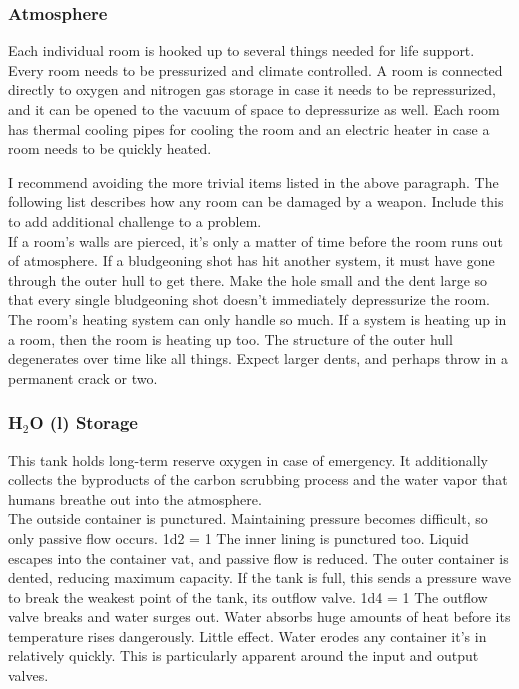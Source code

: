 \documentclass[a4paper]{article}
\begin{document}
\vspace{-0.5cm} \hspace{-18pt} \subsubsection{Atmosphere} \label{life_atmosphere} \vspace{-0.2cm}
Each individual room is hooked up to several things needed for life support. Every room needs to be pressurized and climate controlled. A room is connected directly to oxygen and nitrogen gas storage in case it needs to be repressurized, and it can be opened to the vacuum of space to depressurize as well. Each room has thermal cooling pipes for cooling the room and an electric heater in case a room needs to be quickly heated.

I recommend avoiding the more trivial items listed in the above paragraph. The following list describes how any room can be damaged by a weapon. Include this to add additional challenge to a problem. 
\\ \pbhw
{If a room's walls are pierced, it's only a matter of time before the room runs out of atmosphere.}
{If a bludgeoning shot has hit another system, it must have gone through the outer hull to get there. Make the hole small and the dent large so that every single bludgeoning shot doesn't immediately depressurize the room.}
{The room's heating system can only handle so much. If a system is heating up in a room, then the room is heating up too.}
{The structure of the outer hull degenerates over time like all things. Expect larger dents, and perhaps throw in a permanent crack or two. }


\vspace{-0.5cm} \hspace{-18pt} \subsubsection{H$_2$O (l) Storage} \label{life_h2o_storage} \vspace{-0.2cm}
This tank holds long-term reserve oxygen in case of emergency. It additionally collects the byproducts of the carbon scrubbing process and the water vapor that humans breathe out into the atmosphere.
\\ \pbhw
{The outside container is punctured. Maintaining pressure becomes difficult, so only passive flow occurs. \newline 1d2 = 1 The inner lining is punctured too. Liquid escapes into the container vat, and passive flow is reduced.}
{The outer container is dented, reducing maximum capacity. If the tank is full, this sends a pressure wave to break the weakest point of the tank, its outflow valve. 1d4 = 1 The outflow valve breaks and water surges out.}
{Water absorbs huge amounts of heat before its temperature rises dangerously. Little effect.}
{Water erodes any container it's in relatively quickly. This is particularly apparent around the input and output valves.}
\end{document}
